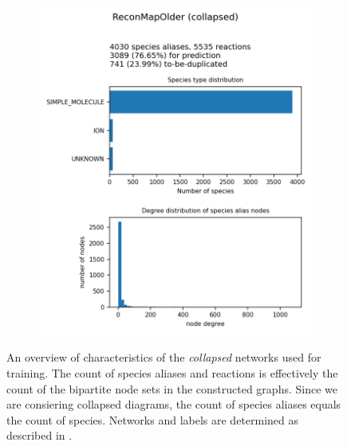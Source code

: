 \documentclass[
	fontsize=10pt, %
	twoside=false, %
	secnumdepth=1, %
  toc=indentunnumbered %
]{kaobook}
\begin{document}
\begin{figure}[h]
\begin{subfigure}{0.32\textwidth}
  \end{subfigure} 
  \begin{subfigure}{0.32\textwidth}
    \includegraphics[width=\linewidth]{generated/ReconMapOlder.png}
  \end{subfigure} 
  \caption[
  An overview of characteristics of networks used for training.
  ]{ An overview of characteristics of the \textit{collapsed} networks
    used for training. The count of species aliases and reactions is effectively
    the count of the bipartite node sets in the constructed graphs. Since we are
    consiering collapsed diagrams, the count of species aliases equals the count
    of species.
    Networks and labels are determined as described in
    . }
  \label{fig:maps-summary}
\end{figure}

\end{document}
